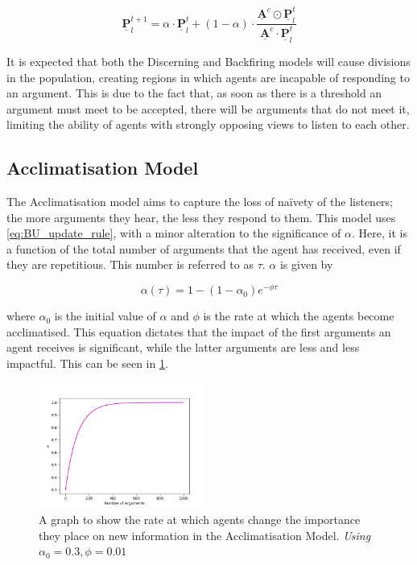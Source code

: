 \begin{equation} \label{eq:Backfiring_update_rule}
    \underline{\mathbf{P}}^{t+1}_l = \alpha \cdot \underline{\mathbf{P}}^{t}_l + (1 - \alpha) \cdot  \frac{\underline{\mathbf{A}}^c \odot \underline{\mathbf{P}}^t_l}{\underline{\mathbf{A}}^c \cdot \underline{\mathbf{P}}^t_l}
\end{equation}

It is expected that both the Discerning and Backfiring models will cause divisions in the population, creating regions in which agents are incapable of responding to an argument. This is due to the fact that, as soon as there is a threshold an argument must meet to be accepted, there will be arguments that do not meet it, limiting the ability of agents with strongly opposing views to listen to each other. 



\subsection*{Acclimatisation Model}

The Acclimatisation model aims to capture the loss of na\"{i}vety of the listeners; the more arguments they hear, the less they respond to them. This model uses \cref{eq:BU_update_rule}, with a minor alteration to the significance of $\alpha$. Here, it is a function of the total number of arguments that the agent has received, even if they are repetitious. This number is referred to as $\tau$. $\alpha$ is given by

\begin{equation}
    \alpha (\tau) = 1 - (1 - \alpha_0) e^{-\phi \tau}
\end{equation}

where $\alpha_0$ is the initial value of $\alpha$ and $\phi$ is the rate at which the agents become acclimatised. This equation dictates that the impact of the first arguments an agent receives is significant, while the latter arguments are less and less impactful. This can be seen in \cref{fig:stubbornness_curve}. 

\begin{figure}[H]
    \centering
    \includegraphics[width=0.49\textwidth]{Images/Misc/Stubbornness.png}
    \caption{A graph to show the rate at which agents change the importance they place on new information in the Acclimatisation Model. \textit{Using $\alpha_0 = 0.3, \phi = 0.01$}}
    \label{fig:stubbornness_curve}
\end{figure}


